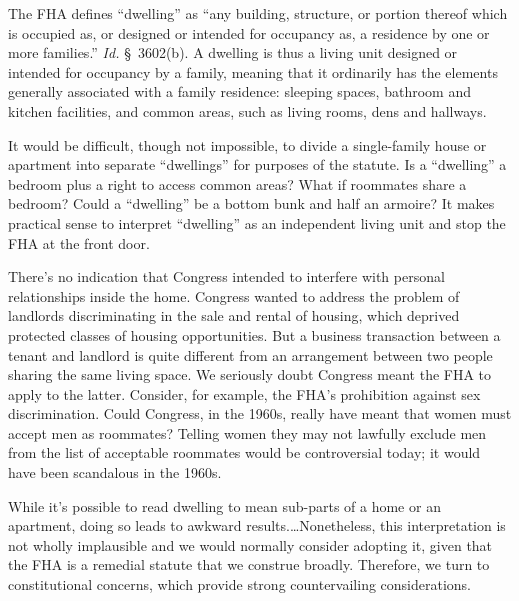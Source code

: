 The FHA defines ``dwelling'' as ``any building, structure, or portion thereof
which is occupied as, or designed or intended for occupancy as, a residence by
one or more families.'' \emph{Id.} \S~3602(b). A dwelling is thus a living unit
designed or intended for occupancy by a family, meaning that it ordinarily has
the elements generally associated with a family residence: sleeping spaces,
bathroom and kitchen facilities, and common areas, such as living rooms, dens
and hallways.  

It would be difficult, though not impossible, to divide a single-family house or
apartment into separate ``dwellings'' for purposes of the statute. Is a
``dwelling'' a bedroom plus a right to access common areas? What if roommates
share a bedroom? Could a ``dwelling'' be a bottom bunk and half an armoire? It
makes practical sense to interpret ``dwelling'' as an independent living unit
and stop the FHA at the front door.

 There's no indication that Congress intended to interfere with personal
relationships inside the home. Congress wanted to address the problem of
landlords discriminating in the sale and rental of housing, which deprived
protected classes of housing opportunities. But a business transaction between
a tenant and landlord is quite different from an arrangement between two people
sharing the same living space. We seriously doubt Congress meant the FHA to
apply to the latter. Consider, for example, the FHA's prohibition against sex
discrimination. Could Congress, in the 1960s, really have meant that women must
accept men as roommates? Telling women they may not lawfully exclude men from
the list of acceptable roommates would be controversial today; it would have
been scandalous in the 1960s.

While it's possible to read dwelling to mean sub-parts of a home or an
apartment, doing so leads to awkward results.\ldots Nonetheless, this
interpretation is not wholly implausible and we would normally consider
adopting it, given that the FHA is a remedial statute that we construe broadly.
Therefore, we turn to constitutional concerns, which provide strong
countervailing considerations. 



